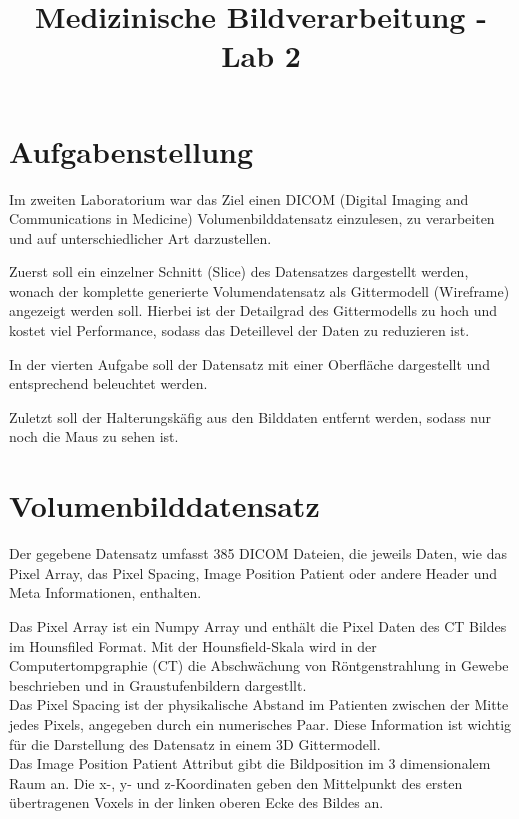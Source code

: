 \documentclass[conference]{IEEEtran}
\begin{document}
\title{Medizinische Bildverarbeitung - Lab 2}

\author{
}

\maketitle

\section{Aufgabenstellung}
Im zweiten Laboratorium war das Ziel einen DICOM (Digital Imaging and Communications in Medicine) Volumenbilddatensatz einzulesen, zu verarbeiten und auf unterschiedlicher Art darzustellen.

Zuerst soll ein einzelner Schnitt (Slice) des Datensatzes dargestellt werden, wonach der komplette generierte Volumendatensatz als Gittermodell (Wireframe) angezeigt werden soll. Hierbei ist der Detailgrad des Gittermodells zu hoch und kostet viel Performance, sodass das Deteillevel der Daten zu reduzieren ist.

In der vierten Aufgabe soll der Datensatz mit einer Oberfläche dargestellt und entsprechend beleuchtet werden.

Zuletzt soll der Halterungskäfig aus den Bilddaten entfernt werden, sodass nur noch die Maus zu sehen ist.

\section{Volumenbilddatensatz}

Der gegebene Datensatz umfasst 385 DICOM Dateien, die jeweils Daten, wie das Pixel Array, das Pixel Spacing, Image Position Patient oder andere Header und Meta Informationen, enthalten.

Das Pixel Array ist ein Numpy Array und enthält die Pixel Daten des CT Bildes im Hounsfiled Format. Mit der Hounsfield-Skala wird in der Computertompgraphie (CT) die Abschwächung von Röntgenstrahlung in Gewebe beschrieben und in Graustufenbildern dargestllt. \cite{wiki:HU} \\
Das Pixel Spacing ist der physikalische Abstand im Patienten zwischen der Mitte jedes Pixels, angegeben durch ein numerisches Paar. Diese Information ist wichtig für die Darstellung des Datensatz in einem 3D Gittermodell. \\
Das Image Position Patient Attribut gibt die Bildposition im 3 dimensionalem Raum an. Die x-, y- und z-Koordinaten geben den Mittelpunkt des ersten übertragenen Voxels in der linken oberen Ecke des Bildes an.\cite{pixel_spacing} \\
\end{document}
